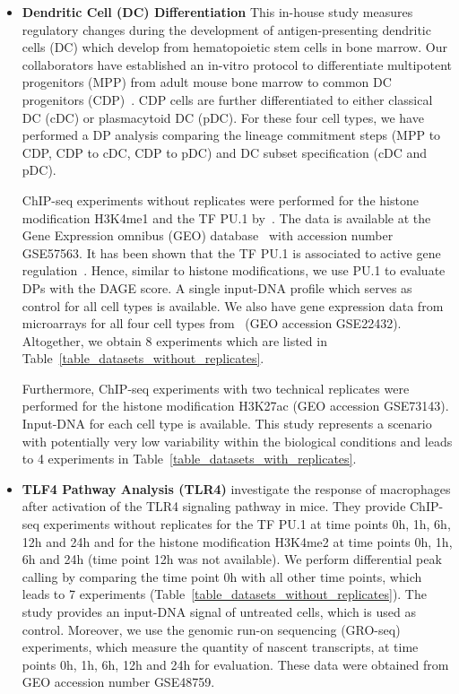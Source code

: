 \begin{itemize}
\item \textbf{Dendritic Cell (DC) Differentiation}
This in-house study measures regulatory changes during the development of antigen-presenting dendritic cells (DC) which  develop from hematopoietic stem cells in bone marrow. 
Our collaborators have established an in-vitro protocol to differentiate multipotent progenitors (MPP) from adult mouse bone marrow to common DC progenitors (CDP)~\citep{felker2010}. 
CDP cells are further differentiated to either classical DC (cDC) or plasmacytoid DC (pDC). 
For these four cell types, we have performed a DP analysis comparing the lineage commitment steps (MPP to CDP, CDP to cDC, CDP to pDC) and DC subset specification (cDC and pDC).

ChIP-seq experiments without replicates were performed for the histone modification H3K4me1 and the TF PU.1 by~\cite{Lin2015}.
The data is available at the Gene Expression omnibus (GEO) database~\citep{Edgar2002} with accession number GSE57563.
It has been shown that the TF PU.1 is associated to active gene regulation~\citep{Lin2015}.
Hence, similar to histone modifications, we use PU.1 to evaluate DPs with the DAGE score.
A single input-DNA profile which serves as control for all cell types is available.
We also have gene expression data from microarrays for all four cell types from~\cite{felker2010} (GEO accession GSE22432).
Altogether, we obtain 8 experiments which are listed in Table~\ref{table_datasets_without_replicates}.

Furthermore, ChIP-seq experiments with two technical replicates were performed for the histone modification H3K27ac (GEO accession GSE73143).
Input-DNA for each cell type is available.
This study represents a scenario with potentially very low variability within the biological conditions and leads to 4 experiments in Table~\ref{table_datasets_with_replicates}.

\item \textbf{TLF4 Pathway Analysis (TLR4)}
\cite{kaikonnen2013} investigate the response of macrophages after activation of the TLR4 signaling pathway in mice.
They provide ChIP-seq experiments without replicates for the TF PU.1 at time points 0h, 1h, 6h, 12h and 24h and for the histone modification H3K4me2 at time points 0h, 1h, 6h and 24h (time point 12h was not available). 
We perform differential peak calling by comparing the time point 0h with all other time points, which leads to 7 experiments (Table~\ref{table_datasets_without_replicates}).
The study provides an input-DNA signal of untreated cells, which is used as control.
Moreover, we use the genomic run-on sequencing (GRO-seq) experiments, which measure the quantity of nascent transcripts, at time points 0h, 1h, 6h, 12h and 24h for evaluation. 
These data were obtained from GEO accession number GSE48759.


\end{itemize}
